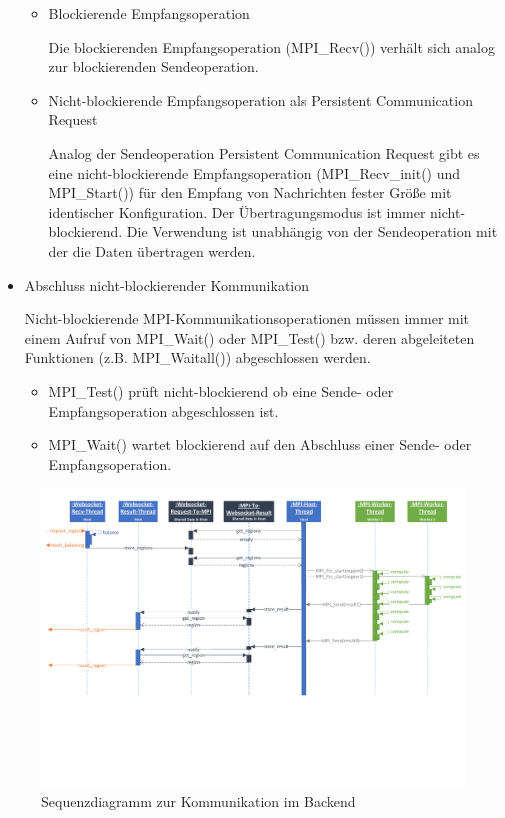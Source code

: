\begin{itemize}
\begin{itemize}
		      \item Blockierende Empfangsoperation

		            Die blockierenden Empfangsoperation (MPI\_Recv()) verhält sich analog zur blockierenden Sendeoperation.

		      \item Nicht-blockierende Empfangsoperation als Persistent Communication Request

		            Analog der Sendeoperation Persistent Communication Request gibt es eine nicht-blockierende Empfangsoperation (MPI\_Recv\_init() und MPI\_Start()) für den Empfang von Nachrichten fester Größe mit identischer Konfiguration. Der Übertragungsmodus ist immer nicht-blockierend. Die Verwendung ist unabhängig von der Sendeoperation mit der die Daten übertragen werden.

	      \end{itemize}

	\item Abschluss nicht-blockierender Kommunikation

	      Nicht-blockierende MPI-Kommunikationsoperationen müssen immer mit einem Aufruf von MPI\_Wait() oder MPI\_Test() bzw. deren abgeleiteten Funktionen (z.B. MPI\_Waitall()) abgeschlossen werden.

	      \begin{itemize}
		      \item MPI\_Test() prüft nicht-blockierend ob eine Sende- oder Empfangsoperation abgeschlossen ist.

		      \item MPI\_Wait() wartet blockierend auf den Abschluss einer Sende- oder Empfangsoperation.
	      \end{itemize}

\end{itemize}

\begin{figure}[p]
	\hspace{20mm}
	\includegraphics[angle = 90, origin = c, trim = 0mm 0mm 0mm 0mm, clip, width=0.98\linewidth]{img/Implementierung/MPISequenzdiagrammFarben.pdf}
	\caption{Sequenzdiagramm zur Kommunikation im Backend}
	\label{fig:mpi_sequenzdiagramm}
\end{figure}


